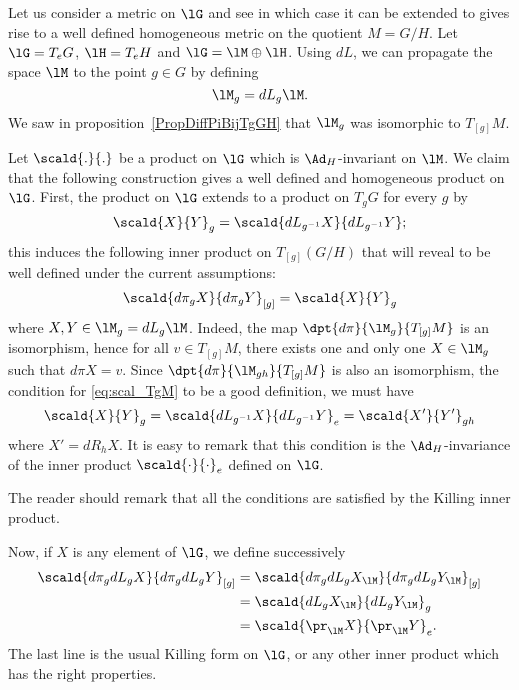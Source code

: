 Let us consider a metric on $\lG$ and see in which case it can be extended to gives rise to a well defined homogeneous metric on the quotient $M=G/H$. Let $\lG=T_eG$, $\lH=T_eH$ and $\lG=\lM\oplus\lH$. Using $dL$, we can propagate the space $\lM$ to the point $g\in G$ by defining
\[
  \lM_g=dL_g\lM.\label{pg:M_g}
\]
We saw in proposition~\ref{PropDiffPiBijTgGH} that $\lM_g$ was isomorphic to $T_{[g]}M$.


Let $\scald{.}{.}$ be a product on $\lG$ which is $\Ad_H$-invariant on $\lM$. We claim that the following construction gives a well defined and homogeneous product on $\lG$. First, the product on $\lG$ extends to a product on $T_gG$ for every $g$ by
\[
  \scald{X}{Y}_g=\scald{dL_{g^{-1}}X}{dL_{g^{-1}}Y};
\]
this induces the following inner product on $T_{[g]}(G/H)$ that will reveal to be well defined under the current assumptions:
\begin{equation}\label{eq:scal_TgM}
	\scald{d\pi_g X}{d\pi_g Y}_{[g]}=\scald{X}{Y}_g
\end{equation}
where $X,Y\in \lM_g=dL_g\lM$. Indeed, the map $\dpt{d\pi}{\lM_g}{T_{[g]}M}$ is an isomorphism, hence for all $v\in T_{[g]}M$, there exists one and only one $X\in\lM_g$ such that $d\pi X=v$. Since $\dpt{d\pi}{\lM_{gh}}{T_{[g]}M}$ is also an isomorphism, the condition for \eqref{eq:scal_TgM} to be a good definition, we must have
\begin{equation}
\scald{X}{Y}_g=\scald{dL_{g^{-1}} X}{dL_{g^{-1}} Y}_e
              =\scald{X'}{Y'}_{gh}
      \end{equation}
where $X'=dR_hX$. It is easy to remark that this condition is the $\Ad_H$-invariance of the inner product $\scald{\cdot}{\cdot}_e$ defined on $\lG$.

The reader should remark that all the conditions are satisfied by the Killing inner product.

Now, if $X$ is any element of $\lG$, we define successively
\begin{equation}		\label{EqDefProdGsurH}
	\begin{aligned}[]
		\scald{d\pi_gdL_gX}{d\pi_gdL_gY }_{[g]}&=\scald{d\pi_gdL_gX_{\lM}}{d\pi_gdL_gY_{\lM}}_{[g]}\\
		&=\scald{dL_gX_{\lM}}{dL_gY_{\lM}}_g\\
		&=\scald{\pr_{\lM}X}{\pr_{\lM}Y}_e.
	\end{aligned}
\end{equation}
The last line is the usual Killing form on $\lG$, or any other inner product which has the right properties.

